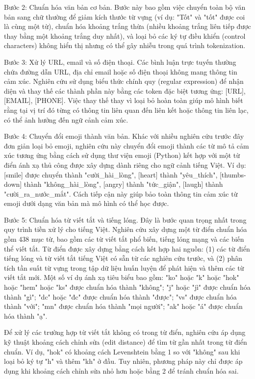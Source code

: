 \documentclass[14pt, a4paper]{report}
\begin{document}
Bước 2: Chuẩn hóa văn bản cơ bản. Bước này bao gồm việc chuyển toàn bộ văn bản sang chữ thường để giảm kích thước từ vựng (ví dụ: "Tốt" và "tốt" được coi là cùng một từ), chuẩn hóa khoảng trắng thừa (nhiều khoảng trắng liên tiếp được thay bằng một khoảng trắng duy nhất), và loại bỏ các ký tự điều khiển (control characters) không hiển thị nhưng có thể gây nhiễu trong quá trình tokenization.


Bước 3: Xử lý URL, email và số điện thoại. Các bình luận trực tuyến thường chứa đường dẫn URL, địa chỉ email hoặc số điện thoại không mang thông tin cảm xúc. Nghiên cứu sử dụng biểu thức chính quy (regular expression) để nhận diện và thay thế các thành phần này bằng các token đặc biệt tương ứng: [URL], [EMAIL], [PHONE]. Việc thay thế thay vì loại bỏ hoàn toàn giúp mô hình biết rằng tại vị trí đó từng có thông tin liên quan đến liên kết hoặc thông tin liên lạc, có thể ảnh hưởng đến ngữ cảnh cảm xúc.


Bước 4: Chuyển đổi emoji thành văn bản. Khác với nhiều nghiên cứu trước đây đơn giản loại bỏ emoji, nghiên cứu này chuyển đổi emoji thành các từ mô tả cảm xúc tương ứng bằng cách sử dụng thư viện emoji (Python) kết hợp với một từ điển ánh xạ thủ công được xây dựng dành riêng cho ngữ cảnh tiếng Việt. Ví dụ: [smile] được chuyển thành "cười\_hài\_lòng", [heart] thành "yêu\_thích", [thumbs-down] thành "không\_hài\_lòng", [angry] thành "tức\_giận", [laugh] thành "cười\_ra\_nước\_mắt". Cách tiếp cận này giúp bảo toàn thông tin cảm xúc từ emoji dưới dạng văn bản mà mô hình có thể học được.


Bước 5: Chuẩn hóa từ viết tắt và tiếng lóng. Đây là bước quan trọng nhất trong quy trình tiền xử lý cho tiếng Việt. Nghiên cứu xây dựng một từ điển chuẩn hóa gồm 438 mục từ, bao gồm các từ viết tắt phổ biến, tiếng lóng mạng và các biến thể viết tắt. Từ điển được xây dựng bằng cách kết hợp hai nguồn: (1) các từ điển tiếng lóng và từ viết tắt tiếng Việt có sẵn từ các nghiên cứu trước, và (2) phân tích tần suất từ vựng trong tập dữ liệu huấn luyện để phát hiện và thêm các từ viết tắt mới. Một số ví dụ ánh xạ tiêu biểu bao gồm: "ko" hoặc "k" hoặc "hok" hoặc "hem" hoặc "ks" được chuẩn hóa thành "không"; "j" hoặc "jì" được chuẩn hóa thành "gì"; "dc" hoặc "đc" được chuẩn hóa thành "được"; "vs" được chuẩn hóa thành "với"; "mn" được chuẩn hóa thành "mọi người"; "ak" hoặc "á" được chuẩn hóa thành "ạ".


Để xử lý các trường hợp từ viết tắt không có trong từ điển, nghiên cứu áp dụng kỹ thuật khoảng cách chỉnh sửa (edit distance) để tìm từ gần nhất trong từ điển chuẩn. Ví dụ, "hok" có khoảng cách Levenshtein bằng 1 so với "không" sau khi loại bỏ ký tự "h" và thêm "kh" ở đầu. Tuy nhiên, phương pháp này chỉ được áp dụng khi khoảng cách chỉnh sửa nhỏ hơn hoặc bằng 2 để tránh chuẩn hóa sai.
\end{document}
